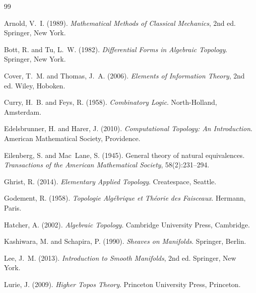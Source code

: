 \documentclass[12pt, oneside]{book}
\theoremstyle{flyxion}
\theoremstyle{definition}
\begin{document}
\begin{thebibliography}{99}


Arnold, V.~I. (1989).
\newblock \textit{Mathematical Methods of Classical Mechanics}, 2nd ed.
\newblock Springer, New York.

Bott, R. and Tu, L.~W. (1982).
\newblock \textit{Differential Forms in Algebraic Topology}.
\newblock Springer, New York.

Cover, T.~M. and Thomas, J.~A. (2006).
\newblock \textit{Elements of Information Theory}, 2nd ed.
\newblock Wiley, Hoboken.

Curry, H.~B. and Feys, R. (1958).
\newblock \textit{Combinatory Logic}.
\newblock North-Holland, Amsterdam.

Edelsbrunner, H. and Harer, J. (2010).
\newblock \textit{Computational Topology: An Introduction}.
\newblock American Mathematical Society, Providence.

Eilenberg, S. and Mac~Lane, S. (1945).
\newblock General theory of natural equivalences.
\newblock \textit{Transactions of the American Mathematical Society},
  58(2):231--294.

Ghrist, R. (2014).
\newblock \textit{Elementary Applied Topology}.
\newblock Createspace, Seattle.

Godement, R. (1958).
\newblock \textit{Topologie Alg\'{e}brique et Th\'{e}orie des Faisceaux}.
\newblock Hermann, Paris.

Hatcher, A. (2002).
\newblock \textit{Algebraic Topology}.
\newblock Cambridge University Press, Cambridge.

Kashiwara, M. and Schapira, P. (1990).
\newblock \textit{Sheaves on Manifolds}.
\newblock Springer, Berlin.

Lee, J.~M. (2013).
\newblock \textit{Introduction to Smooth Manifolds}, 2nd ed.
\newblock Springer, New York.

Lurie, J. (2009).
\newblock \textit{Higher Topos Theory}.
\newblock Princeton University Press, Princeton.


\end{thebibliography}
\end{document}
